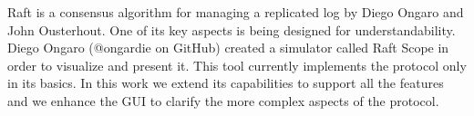 Raft is a consensus algorithm for managing a replicated log by Diego Ongaro and John Ousterhout.
One of its key aspects is being designed for understandability.
Diego Ongaro (@ongardie on GitHub) created a simulator called Raft Scope in order to visualize
and present it.
This tool currently implements the protocol only in its basics.
In this work we extend its capabilities to support all the features
and we enhance the GUI to clarify the more complex aspects of the protocol.
